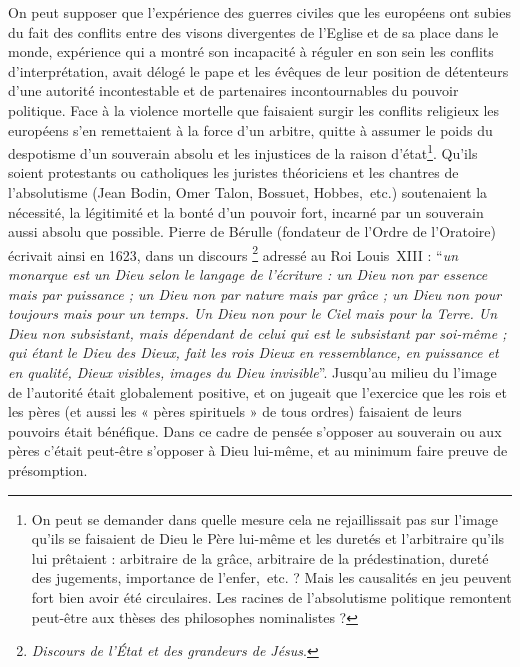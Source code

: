 On peut supposer que l'expérience des guerres civiles que les européens ont subies du fait des conflits entre des visons divergentes de l'Eglise et de sa place dans le monde, expérience qui a montré son incapacité à réguler en son sein les conflits d'interprétation, avait délogé le pape et les évêques de leur position de détenteurs d'une autorité incontestable et de partenaires incontournables du pouvoir politique. Face à la violence mortelle que faisaient surgir les conflits religieux les européens s'en remettaient à la force d'un arbitre, quitte à assumer le poids du despotisme d'un souverain absolu et les injustices de la raison d'état\footnote{On peut se demander dans quelle mesure cela ne rejaillissait pas sur l'image qu'ils se faisaient de Dieu le Père lui-même et les duretés et l'arbitraire qu'ils lui prêtaient : arbitraire de la grâce, arbitraire de la prédestination, dureté des jugements, importance de l'enfer,~etc. ? Mais les causalités en jeu peuvent fort bien avoir été circulaires. Les racines de l'absolutisme politique remontent peut-être aux thèses des philosophes nominalistes ?}. Qu'ils soient protestants ou catholiques les juristes théoriciens et les chantres de l'absolutisme (Jean Bodin, Omer Talon, Bossuet, Hobbes,~etc.) soutenaient la nécessité, la légitimité et la bonté d'un pouvoir fort, incarné par un souverain aussi absolu que possible. Pierre de Bérulle (fondateur de l'Ordre de l'Oratoire) écrivait ainsi en 1623, dans un discours \footnote{\emph{Discours de l'État et des grandeurs de Jésus}.} adressé au Roi Louis~XIII  :
    \enquote{\emph{un monarque est un Dieu selon le langage de l'écriture : un Dieu non par essence mais par puissance ; un Dieu non par nature mais par grâce ; un Dieu non pour toujours mais pour un temps. Un Dieu non pour le Ciel mais pour la Terre. Un Dieu non subsistant, mais dépendant de celui qui est le subsistant par soi-même ; qui étant le Dieu des Dieux, fait les rois Dieux en ressemblance, en puissance et en qualité, Dieux visibles, images du Dieu invisible}}.  Jusqu'au milieu du  l'image de l'autorité était globalement positive, et on jugeait que l'exercice que les rois et les pères (et aussi les « pères spirituels » de tous ordres) faisaient de leurs pouvoirs était bénéfique. Dans ce cadre de pensée s'opposer au souverain ou aux pères c'était peut-être s'opposer à Dieu lui-même, et au minimum faire preuve de présomption. 


